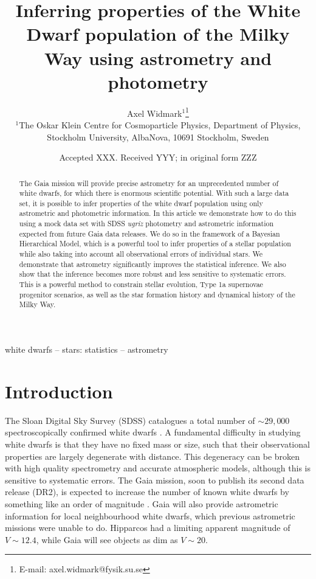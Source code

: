 \documentclass[fleqn,usenatbib]{mnras}
\title[Inferring properties of the White Dwarf population]{Inferring properties of the White Dwarf population of the Milky Way using astrometry and photometry}
\author[A. Widmark]{
Axel Widmark$^1$\thanks{E-mail: axel.widmark@fysik.su.se} 
\\
$^1$The Oskar Klein Centre for Cosmoparticle Physics, Department of
Physics, Stockholm University, AlbaNova, 10691 Stockholm, Sweden\\
}
\date{Accepted XXX. Received YYY; in original form ZZZ}
\begin{document}
\label{firstpage}
\pagerange{\pageref{firstpage}--\pageref{lastpage}}
\maketitle

\begin{abstract}
The Gaia mission will provide precise astrometry for an unprecedented number of white dwarfs, for which there is enormous scientific potential. With such a large data set, it is possible to infer properties of the white dwarf population using only astrometric and photometric information. In this article we demonstrate how to do this using a mock data set with SDSS \emph{ugriz} photometry and astrometric information expected from future Gaia data releases.
We do so in the framework of a Bayesian Hierarchical Model, which is a powerful tool to infer properties of a stellar population while also taking into account all observational errors of individual stars. We demonstrate that astrometry significantly improves the statistical inference. We also show that the inference becomes more robust and less sensitive to systematic errors.
This is a powerful method to constrain stellar evolution, Type 1a supernovae progenitor scenarios, as well as the star formation history and dynamical history of the Milky Way.
\end{abstract}

\begin{keywords}
white dwarfs -- stars: statistics -- astrometry
\end{keywords}









\section{Introduction}

The Sloan Digital Sky Survey (SDSS) catalogues a total number of $\sim 29,000$ spectroscopically confirmed white dwarfs \citep{2013ApJS..204....5K,2015MNRAS.446.4078K}. A fundamental difficulty in studying white dwarfs is that they have no fixed mass or size, such that their observational properties are largely degenerate with distance. This degeneracy can be broken with high quality spectrometry and accurate atmospheric models, although this is sensitive to systematic errors. The Gaia mission, soon to publish its second data release (DR2), is expected to increase the number of known white dwarfs by something like an order of magnitude \citep{2014A&A...565A..11C,Jordan:2006jg}. Gaia will also provide astrometric information for local neighbourhood white dwarfs, which previous astrometric missions were unable to do. Hipparcos had a limiting apparent magnitude of $V \sim 12.4$, while Gaia will see objects as dim as $V \sim 20$.
\end{document}
